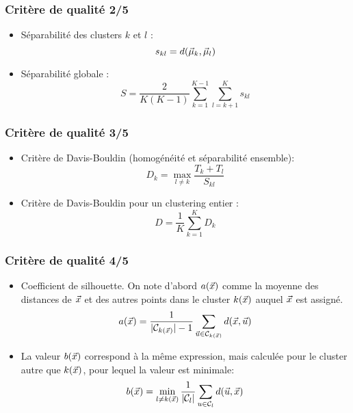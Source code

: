 \begin{frame}
\frametitle{Critère de qualité 2/5}
\begin{itemize}
	\item Séparabilité des clusters $k$ et $l$ : 
	\begin{equation*}
	s_{kl} = d(\vec{\mu}_k, \vec{\mu}_l)
	\end{equation*}
	\item Séparabilité globale : 
	\begin{equation*}
	S = \frac{2}{K(K-1)}\sum_{k=1}^{K-1}\sum_{l=k+1}^{K}s_{kl}
	\end{equation*}
\end{itemize}
\end{frame}

\begin{frame}
\frametitle{Critère de qualité 3/5}
\begin{itemize}
	\item Critère de Davis-Bouldin (homogénéité et séparabilité ensemble): 
	\begin{equation*}
	D_k = \max_{l\neq k} \frac{T_k + T_l}{S_{kl}}
	\end{equation*}
	\item Critère de Davis-Bouldin pour un clustering entier : 
	\begin{equation*}
	D = \frac1K \sum_{k=1}^{K}D_k
	\end{equation*}
\end{itemize}
\end{frame}

\begin{frame}
\frametitle{Critère de qualité 4/5}
\begin{itemize}
	\item Coefficient de silhouette. On note d'abord $a(\vec{x})$ comme la moyenne des distances de $\vec{x}$ et des autres points dans le cluster $k(\vec{x})$ auquel $\vec{x}$ est assigné. 	
	\begin{equation*}
	a(\vec{x}) = \frac{1}{|\mathcal{C}_{k(\vec{x})}| - 1} \sum_{\vec{u} \in \mathcal{C}_{k(\vec{x})}}d(\vec{x}, \vec{u})
	\end{equation*}
	\item La valeur $b(\vec{x})$ correspond à la même expression, mais calculée pour le cluster autre que $k(\vec{x})$, pour lequel la valeur est minimale: 	
	\begin{equation*}
	b(\vec{x}) = \min_{l\neq k(\vec{x})}\frac{1}{|\mathcal{C}_l|} \sum_{u \in \mathcal{C}_l}d(\vec{u}, \vec{x})
	\end{equation*}
\end{itemize}
\end{frame}

